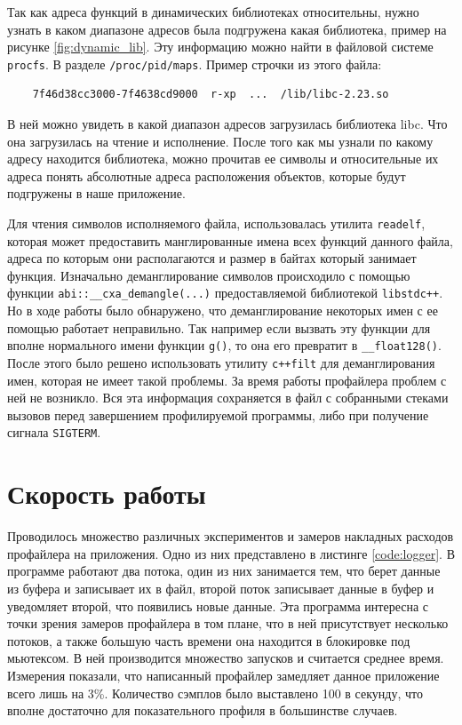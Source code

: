     Так как адреса функций в динамических библиотеках относительны, нужно узнать в каком диапазоне адресов была подгружена какая библиотека, пример на рисунке \ref{fig:dynamic_lib}. Эту информацию можно найти в файловой системе \verb|procfs|. В разделе \verb|/proc/pid/maps|. Пример строчки из этого файла:
\begin{lstlisting}
    7f46d38cc3000-7f4638cd9000  r-xp  ...  /lib/libc-2.23.so
\end{lstlisting}
    В ней можно увидеть в какой диапазон адресов загрузилась библиотека libc. Что она загрузилась на чтение и исполнение. После того как мы узнали по какому адресу находится библиотека, можно прочитав ее символы и относительные их адреса понять абсолютные адреса расположения объектов, которые будут подгружены в наше приложение.
    
    Для чтения символов исполняемого файла, использовалась утилита \verb|readelf|, которая может предоставить манглированные имена всех функций данного файла, адреса по которым они располагаются и размер в байтах который занимает функция. Изначально деманглирование символов происходило с помощью функции \verb|abi::__cxa_demangle(...)| предоставляемой библиотекой \verb|libstdc++|. Но в ходе работы было обнаружено, что деманглирование некоторых имен  с ее помощью работает неправильно. Так например если вызвать эту функции для вполне нормального имени функции \verb|g()|, то она его превратит в \verb|__float128()|. После этого было решено использовать утилиту \verb|c++filt| для деманглирования имен, которая не имеет такой проблемы. За время работы профайлера проблем с ней не возникло. Вся эта информация сохраняется в файл с собранными стеками вызовов перед завершением профилируемой программы, либо при получение сигнала \verb|SIGTERM|. 

    
\section{Скорость работы}
	Проводилось множество различных экспериментов и замеров накладных расходов профайлера на приложения. Одно из них представлено в листинге \ref{code:logger}. В программе работают два потока, один из них занимается тем, что берет данные из буфера и записывает их в файл, второй поток записывает данные в буфер и уведомляет второй, что появились новые данные. Эта программа интересна с точки зрения замеров профайлера в том плане, что в ней присутствует несколько потоков, а также большую часть времени она находится в блокировке под мьютексом. В ней производится множество запусков и считается среднее время. Измерения показали, что написанный профайлер замедляет данное приложение всего лишь на 3\%. Количество сэмплов было выставлено 100 в секунду, что вполне достаточно для показательного профиля в большинстве случаев. 
    
